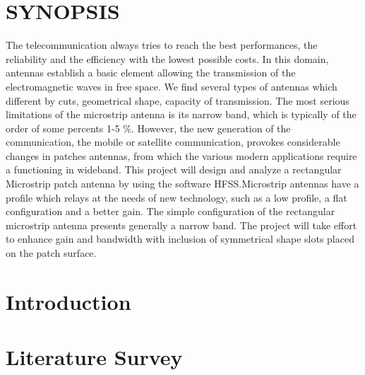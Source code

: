 \documentclass[12pt]{article}
\begin{document}
\tableofcontents
\thispagestyle{empty}
\cleardoublepage
\listoffigures
\thispagestyle{empty}
\cleardoublepage
\listoftables
\thispagestyle{empty}
\cleardoublepage


\section*{SYNOPSIS}
	\justify
	The telecommunication always tries to reach the best performances, the reliability and the efficiency with the lowest possible costs. In this domain, antennas establish a basic element allowing the transmission of the electromagnetic waves in free space. We find several types of antennas which different by cuts, geometrical shape, capacity of transmission. The most serious limitations of the microstrip antenna is its narrow band, which is typically of the order of some percents 1-5 \%. However, the new generation of the communication, the mobile or satellite communication, provokes considerable changes in patches antennas, from which the various modern applications require a functioning in wideband.
	This  project will design and analyze a rectangular Microstrip patch antenna by using the software HFSS.Microstrip antennas have a profile which relays at the needs of new technology, such as a low profile, a flat configuration and a better gain. The simple configuration of the rectangular microstrip antenna presents generally a narrow band. The project will take effort to enhance gain and bandwidth with inclusion of symmetrical shape slots placed on the patch surface.
\thispagestyle{empty}
\cleardoublepage





\setcounter{page}{1}
\section{Introduction}\label{sec:Introduction}
	
	
\section{Literature Survey}\label{sec:Literature Survey}
	
\end{document}

